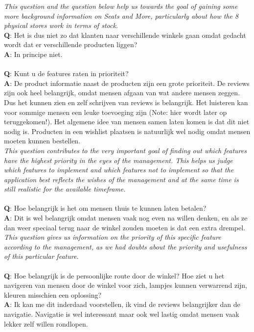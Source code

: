 \documentclass[a4paper]{article}
\begin{document}
\textit{This question and the question below help us towards the goal of gaining some more background information on Seats and More, particularly about how the 8 physical stores work in terms of stock.}
\\
\textbf{Q}: Het is dus niet zo dat klanten naar verschillende winkels gaan omdat gedacht wordt dat er verschillende producten liggen?\\
\textbf{A}: In principe niet.\\
\\
\textbf{Q}: Kunt u de features raten in prioriteit?\\
\textbf{A}: De product informatie naast de producten zijn een grote prioriteit. De reviews zijn ook heel belangrijk, omdat mensen afgaan van wat andere mensen zeggen. Dus het kunnen zien en zelf schrijven van reviews is belangrijk. Het luisteren kan voor sommige mensen een leuke toevoeging zijn (Note: hier wordt later op teruggekomen!). Het algemene idee van mensen samen laten komen is dat dit niet nodig is. Producten in een wishlist plaatsen is natuurlijk wel nodig omdat mensen moeten kunnen bestellen. \\
\textit{This question contributes to the very important goal of finding out which features have the highest priority in the eyes of the management. This helps us judge which features to implement and which features not to implement so that the application best reflects the wishes of the management and at the same time is still realistic for the available timeframe.}\\
\\
\textbf{Q}: Hoe belangrijk is het om mensen thuis te kunnen laten betalen?\\
\textbf{A}: Dit is wel belangrijk omdat mensen vaak nog even na willen denken, en als ze dan weer speciaal terug naar de winkel zouden moeten is dat een extra drempel.\\
\textit{This question gives us information on the priority of this specific feature according to the management, as we had doubts about the priority and usefulness of this particular feature. }\\
\\
\textbf{Q}: Hoe belangrijk is de persoonlijke route door de winkel? Hoe ziet u het navigeren van mensen door de winkel voor zich, lampjes kunnen verwarrend zijn, kleuren misschien een oplossing?\\
\textbf{A}: Ik kan me dit inderdaad voorstellen, ik vind de reviews belangrijker dan de navigatie. Navigatie is wel interessant maar ook wel lastig omdat mensen vaak lekker zelf willen rondlopen. \\
\end{document}
